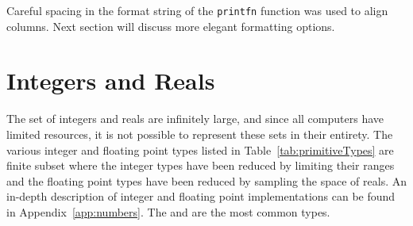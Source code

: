 %
Careful spacing in the format string of the \lstinline|printfn| function was used to align columns. Next section will discuss more elegant formatting options.

\section{Integers and Reals}
The set of integers and reals are infinitely large, and since all computers have limited resources, it is not possible to represent these sets in their entirety. The various integer and floating point types listed in Table~\ref{tab:primitiveTypes} are finite subset where the integer types have been reduced by limiting their ranges and the floating point types have been reduced by sampling the space of reals. An in-depth description of integer and floating point implementations can be found in Appendix~\ref{app:numbers}. The  and  are the most common types. 


